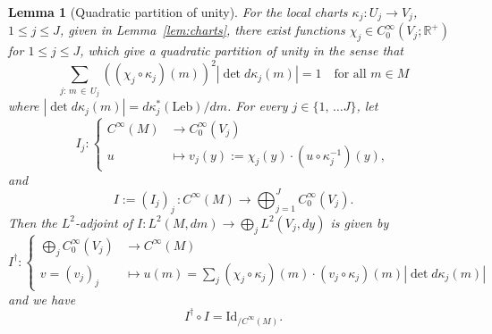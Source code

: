 \documentclass[10pt]{amsart}
\newtheorem{lemm}[theo]{Lemma}\newtheorem{prop}[theo]{Proposition}\newtheorem{coro}[theo]{Corollary}\newtheorem{conj}[theo]{Conjecture}
\theoremstyle{definition}\newtheorem{defi}[theo]{Definition}\newtheorem{rema}[theo]{Remark}\newtheorem{exam}[theo]{Example}\newtheorem{exem}[theo]{Example}\newtheorem{nota}[theo]{Notation}
\newcommand{\Lebb}{\mathrm{Leb}}
\newcommand{\Id}{\mathrm{Id}}
\newcommand{\bbR}{\mathbb{R}}
\begin{document}
\begin{lemm}[Quadratic partition of unity]\label{lem:I-I*}
For the local charts $\kappa_{j}:U_{j}\to V_{j}$, $1\le j\le J$, given in Lemma~\ref{lem:charts}, there exist functions $\chi_{j}\in C_{0}^{\infty}(V_{j};\bbR^{+})$ for $1\le j\le J$, which give a quadratic partition of unity in the sense that
\begin{equation}\label{eq:partition_quadratic_unity-1}
\sum_{j:\,m\,\in\,U_{j}}\left(\left(\chi_{j}\circ\kappa_{j}\right)\left(m\right)\right)^{2}\left|\det d\kappa_{j}\left(m\right)\right|=1\quad\text{for all }m\in M
\end{equation}
where $|\det d\kappa_{j}(m)|=d\kappa_{j}^{*}(\Lebb)/dm$. For every $j\in\{ 1,\,\ldots J\} $, let
\begin{equation}\label{eq:def_I-2}
I_{j}:
\begin{cases}
C^{\infty}\left(M\right) & \rightarrow C_{0}^{\infty}\left(V_{j}\right)\\
u & \mapsto v_{j}\left(y\right):=\chi_{j}\left(y\right)\cdot\left(u\circ\kappa_{j}^{-1}\right)\left(y\right),
\end{cases}
\end{equation}
and
\begin{equation}\label{eq:def_I_1}
I:=\left(I_{j}\right)_{j}\,:C^{\infty}\left(M\right)\rightarrow\bigoplus_{j=1}^{J}C_{0}^{\infty}\left(V_{j}\right).
\end{equation}
Then the $L^{2}$-adjoint of $I:L^{2}(M,dm)\rightarrow\bigoplus_{j}L^{2}(V_{j},dy)$ is given by
\begin{equation}\label{eq:def_I*-2}
I^{\dagger}:
\begin{cases}
\bigoplus_{j}C_{0}^{\infty}\left(V_{j}\right) & \rightarrow C^{\infty}\left(M\right)\\
v=\left(v_{j}\right)_{j} & \mapsto u\left(m\right)=\sum_{j}\left(\chi_{j}\circ\kappa_{j}\right)\left(m\right)\cdot\left(v_{j}\circ\kappa_{j}\right)\left(m\right)\left|\det d\kappa_{j}\left(m\right)\right|
\end{cases}
\end{equation}
and we have
\begin{equation}\label{eq:I*_I}
I^{\dagger}\circ I=\Id _{/C^{\infty}\left(M\right)}.
\end{equation}
\end{lemm}
\end{document}
